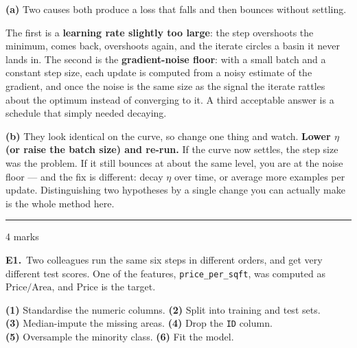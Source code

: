 \documentclass[10pt,a4paper]{article}
\newcommand{\parthead}[2]{\vspace{2pt}\noindent\rule{\linewidth}{0.4pt}\par\vspace{2pt}%
  \noindent{\bfseries Part #1}\hfill{\small #2}\par\vspace{1pt}}
\begin{document}
\textbf{(a)} Two causes both produce a loss that falls and then bounces without settling.\par\vspace{1mm}The first is a \textbf{learning rate slightly too large}: the step overshoots the minimum, comes back, overshoots again, and the iterate circles a basin it never lands in. The second is the \textbf{gradient-noise floor}: with a small batch and a constant step size, each update is computed from a noisy estimate of the gradient, and once the noise is the same size as the signal the iterate rattles about the optimum instead of converging to it. A third acceptable answer is a schedule that simply needed decaying.\par\vspace{1mm}\textbf{(b)} They look identical on the curve, so change one thing and watch. \textbf{Lower $\eta$ (or raise the batch size) and re-run.} If the curve now settles, the step size was the problem. If it still bounces at about the same level, you are at the noise floor --- and the fix is different: decay $\eta$ over time, or average more examples per update. Distinguishing two hypotheses by a single change you can actually make is the whole method here.

\newpage

\parthead{E --- Reasoning}{4 marks}

\textbf{E1.}\ Two colleagues run the same six steps in different orders, and get very different test scores. One of
the features, \texttt{price\_per\_sqft}, was computed as $\text{Price}/\text{Area}$, and $\text{Price}$ is
the target.

\vspace{2mm}
\hspace*{4mm}\textbf{(1)} Standardise the numeric columns. \quad \textbf{(2)} Split into training and test sets.\\
\hspace*{4mm}\textbf{(3)} Median-impute the missing areas. \quad \textbf{(4)} Drop the \texttt{ID} column.\\
\hspace*{4mm}\textbf{(5)} Oversample the minority class. \quad \textbf{(6)} Fit the model.

\vspace{4pt}
\end{document}
